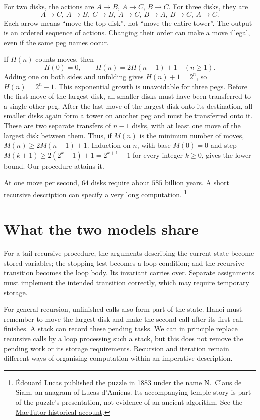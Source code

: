For two disks, the actions are $A\to B$, $A\to C$, $B\to C$.
For three disks, they are
\[
A\to C,\ A\to B,\ C\to B,\ A\to C,\ B\to A,\ B\to C,\ A\to C.
\]
Each arrow means ``move the top disk'', not ``move the entire tower''.
The output is an ordered sequence of actions. Changing their order can
make a move illegal, even if the same peg names occur.

If $H(n)$ counts moves, then
\[
H(0)=0,\qquad H(n)=2H(n-1)+1\quad(n\geq1).
\]
Adding one on both sides and unfolding gives $H(n)+1=2^n$, so
$H(n)=2^n-1$. This exponential growth is unavoidable for three pegs.
Before the first move of the largest disk, all smaller disks must have
been transferred to a single other peg. After the last move of the largest
disk onto its destination, all smaller disks again form a tower on another
peg and must be transferred onto it. These are two separate transfers of
$n-1$ disks, with at least one move of the largest disk between them.
Thus, if $M(n)$ is the minimum number of moves,
$M(n)\geq2M(n-1)+1$. Induction on $n$, with base $M(0)=0$ and step
$M(k+1)\geq2(2^k-1)+1=2^{k+1}-1$ for every integer $k\geq0$, gives the
lower bound. Our procedure attains it.

At one move per second, $64$ disks require about $585$ billion years.
A short recursive description can specify a very long computation.
\footnote{\'Edouard Lucas published the puzzle in 1883 under the name
N.~Claus de Siam, an anagram of Lucas d'Amiens. Its accompanying temple
story is part of the puzzle's presentation, not evidence of an ancient
algorithm. See the \href{https://mathshistory.st-andrews.ac.uk/Extras/Hanoi/}{MacTutor historical account}.}

\section{What the two models share}

For a tail-recursive procedure, the arguments describing the current state
become stored variables; the stopping test becomes a loop condition;
and the recursive transition becomes the loop body. Its invariant carries
over. Separate assignments must implement the intended transition correctly,
which may require temporary storage.

For general recursion, unfinished calls also form part of the state. Hanoi
must remember to move the largest disk and make the second call after its
first call finishes. A stack can record these pending tasks. We can in
principle replace recursive calls by a loop processing such a stack, but
this does not remove the pending work or its storage requirements.
Recursion and iteration remain different ways of organising computation
within an imperative description.


